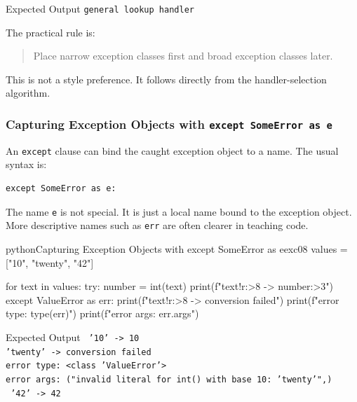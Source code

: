\begin{iobox}{Expected Output}
\texttt{general lookup handler} \\
\end{iobox}


The practical rule is:

\begin{quote}
Place narrow exception classes first and broad exception classes later.
\end{quote}

This is not a style preference. It follows directly from the handler-selection algorithm.

\subsubsection{Capturing Exception Objects with \texttt{except SomeError as e}}

An \texttt{except} clause can bind the caught exception object to a name. The usual syntax is:

\begin{verbatim}
except SomeError as e:
\end{verbatim}

The name \texttt{e} is not special. It is just a local name bound to the exception object. More descriptive names such as \texttt{err} are often clearer in teaching code.

\begin{codebox}[]{python}{Capturing Exception Objects with except SomeError as e}{exc08}
values = ["10", "twenty", "42"]

for text in values:
    try:
        number = int(text)
        print(f"{text!r:>8} -> {number:>3}")
    except ValueError as err:
        print(f"{text!r:>8} -> conversion failed")
        print(f"error type: {type(err)}")
        print(f"error args: {err.args}")
\end{codebox}


\begin{iobox}{Expected Output}
\texttt{    '10' ->  10} \\
\texttt{'twenty' -> conversion failed} \\
\texttt{error type: <class 'ValueError'>} \\
\texttt{error args: ("invalid literal for int() with base 10: 'twenty'",)} \\
\texttt{    '42' ->  42} \\
\end{iobox}


